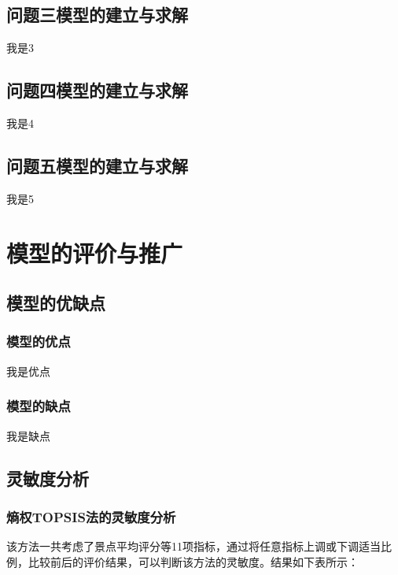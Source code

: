 \documentclass[UTF8,12pt]{ctexart}
\begin{document}
	\subsection{问题三模型的建立与求解}
	
	我是3
	
	\subsection{问题四模型的建立与求解}
	
	我是4
	
	\subsection{问题五模型的建立与求解}
	
	我是5
	
	
	\section{模型的评价与推广}
	
	\subsection{模型的优缺点}
	
	\subsubsection{模型的优点}
	
	我是优点
	
	\subsubsection{模型的缺点}
	
	我是缺点
	
	\subsection{灵敏度分析}
	
	\subsubsection{熵权TOPSIS法的灵敏度分析}
	
	该方法一共考虑了景点平均评分等11项指标，通过将任意指标上调或下调适当比例，比较前后的评价结果，可以判断该方法的灵敏度。结果如下表所示：
	
\end{document}
